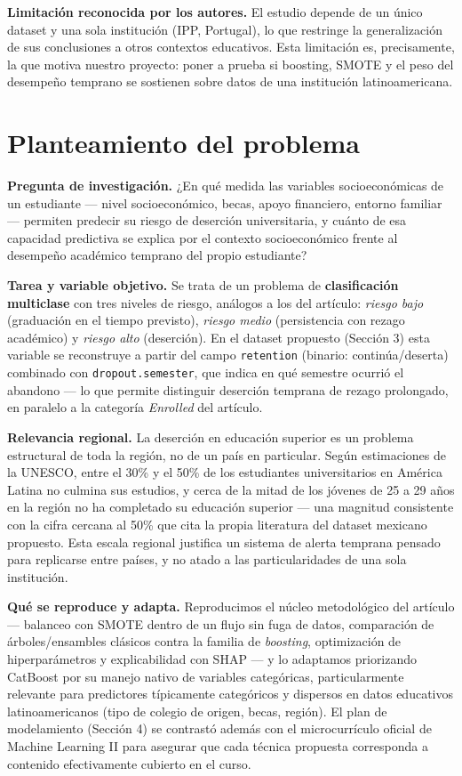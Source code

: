 \documentclass[11pt,a4paper]{article}
\begin{document}
\textbf{Limitación reconocida por los autores.} El estudio depende de un único dataset y una sola institución (IPP, Portugal), lo que restringe la generalización de sus conclusiones a otros contextos educativos. Esta limitación es, precisamente, la que motiva nuestro proyecto: poner a prueba si boosting, SMOTE y el peso del desempeño temprano se sostienen sobre datos de una institución latinoamericana.

\section{Planteamiento del problema}

\textbf{Pregunta de investigación.} ¿En qué medida las variables socioeconómicas de un estudiante --- nivel socioeconómico, becas, apoyo financiero, entorno familiar --- permiten predecir su riesgo de deserción universitaria, y cuánto de esa capacidad predictiva se explica por el contexto socioeconómico frente al desempeño académico temprano del propio estudiante?

\textbf{Tarea y variable objetivo.} Se trata de un problema de \textbf{clasificación multiclase} con tres niveles de riesgo, análogos a los del artículo: \textit{riesgo bajo} (graduación en el tiempo previsto), \textit{riesgo medio} (persistencia con rezago académico) y \textit{riesgo alto} (deserción). En el dataset propuesto (Sección 3) esta variable se reconstruye a partir del campo \texttt{retention} (binario: continúa/deserta) combinado con \texttt{dropout.semester}, que indica en qué semestre ocurrió el abandono --- lo que permite distinguir deserción temprana de rezago prolongado, en paralelo a la categoría \textit{Enrolled} del artículo.

\textbf{Relevancia regional.} La deserción en educación superior es un problema estructural de toda la región, no de un país en particular. Según estimaciones de la UNESCO, entre el 30\% y el 50\% de los estudiantes universitarios en América Latina no culmina sus estudios, y cerca de la mitad de los jóvenes de 25 a 29 años en la región no ha completado su educación superior --- una magnitud consistente con la cifra cercana al 50\% que cita la propia literatura del dataset mexicano propuesto. Esta escala regional justifica un sistema de alerta temprana pensado para replicarse entre países, y no atado a las particularidades de una sola institución.

\textbf{Qué se reproduce y adapta.} Reproducimos el núcleo metodológico del artículo --- balanceo con SMOTE dentro de un flujo sin fuga de datos, comparación de árboles/ensambles clásicos contra la familia de \textit{boosting}, optimización de hiperparámetros y explicabilidad con SHAP --- y lo adaptamos priorizando CatBoost por su manejo nativo de variables categóricas, particularmente relevante para predictores típicamente categóricos y dispersos en datos educativos latinoamericanos (tipo de colegio de origen, becas, región). El plan de modelamiento (Sección 4) se contrastó además con el microcurrículo oficial de Machine Learning II para asegurar que cada técnica propuesta corresponda a contenido efectivamente cubierto en el curso.
\end{document}
